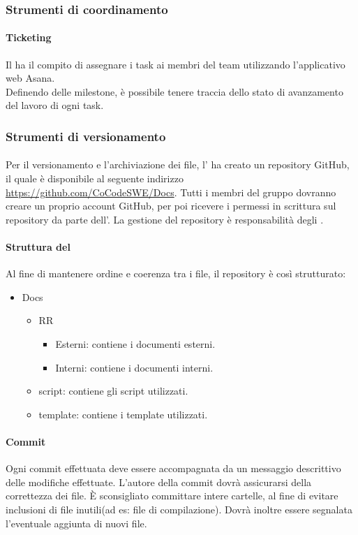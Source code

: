 \subsubsection{Strumenti di coordinamento}
 \paragraph{Ticketing}
 Il \RESP{} ha il compito di assegnare i task ai membri del team utilizzando l'applicativo web Asana. \\
 Definendo delle milestone, è possibile tenere traccia dello stato di avanzamento del lavoro di ogni task.
 
\subsubsection{Strumenti di versionamento}
 \paragraph{}
 Per il versionamento e l'archiviazione dei file, l'\AMM{} ha creato un repository GitHub, il quale è disponibile al seguente indirizzo \url{https://github.com/CoCodeSWE/Docs}. Tutti i membri del gruppo dovranno creare un proprio account GitHub, per poi ricevere i permessi in scrittura sul repository da parte dell'\AMM.
 La gestione del repository è responsabilità degli \AMMP.
 \paragraph{Struttura del }
 Al fine di mantenere ordine e coerenza tra i file, il repository è così strutturato:
 \begin{itemize}
  \item Docs
   \begin{itemize}
    \item RR
     \begin{itemize}
      \item Esterni: contiene i documenti esterni.
      \item Interni: contiene i documenti interni.
     \end{itemize}
     \item script: contiene gli script utilizzati.
     \item template: contiene i template utilizzati.
    \end{itemize}
   \end{itemize}
 \paragraph{Commit}
 Ogni commit effettuata deve essere accompagnata da un messaggio descrittivo delle modifiche effettuate. L'autore della commit dovrà assicurarsi della correttezza dei file. È sconsigliato committare intere cartelle, al fine di evitare inclusioni di file inutili(ad es: file di compilazione).
 Dovrà inoltre essere segnalata l'eventuale aggiunta di nuovi file.
